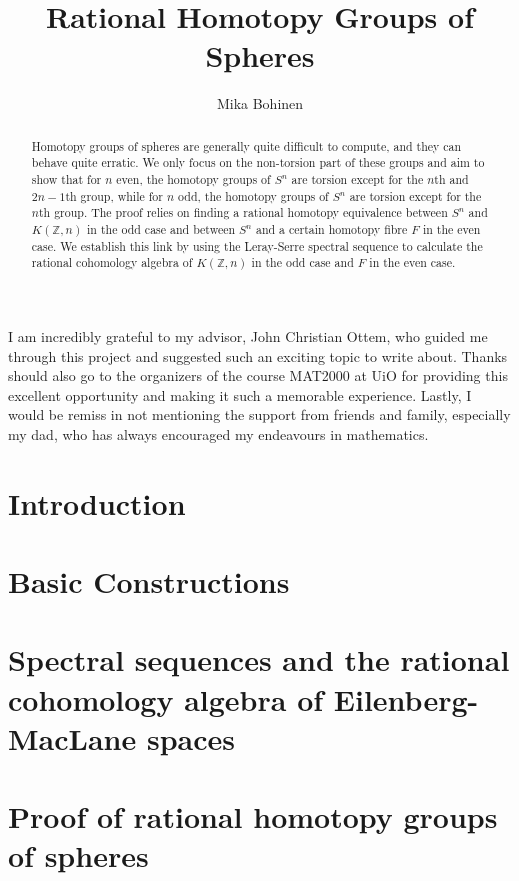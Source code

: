 \documentclass[a4paper, article, oneside, UKenglish]{report}
\title{Rational Homotopy Groups of Spheres}
\author{Mika Bohinen}
\newcommand{\Z}{\mathbb{Z}}   %
\newcommand{\0}{\mathbf{0}}
\newcommand{\1}{\mathbf{1}}
\begin{document}
\uiomasterfp[long=10,
             dept={Department of Mathematics},
             fac={},
             program={MAT2000},
             kind={Project work},
             color=blue,
             supervisor={John Christian Ottem}
]


\begin{abstract}
    \noindent
    Homotopy groups of spheres are generally quite difficult to compute,
    and they can behave quite erratic. We only focus on the non-torsion
    part of these groups and aim to show that for \( n \) even, the
    homotopy groups of \( S^n \) are torsion except for the \( n \)th and
    \( 2n-1 \)th group, while for \( n \) odd, the homotopy groups of
    \( S^n \) are torsion except for the \( n \)th group. The proof
    relies on finding a rational homotopy equivalence between \( S^n \) 
    and \( K(\Z, n) \) in the odd case and between \( S^n \) and
    a certain homotopy fibre \( F \) in the even case. We establish
    this link by using the Leray-Serre spectral sequence to 
    calculate the rational cohomology algebra of \( K(\Z, n) \) in
    the odd case and \( F \) in the even case.
    

\end{abstract}
\section*{}
I am incredibly grateful to my advisor,
John Christian Ottem, who
guided me through this project and suggested such an exciting
topic to write about. Thanks should also go to the organizers of the
course MAT2000 at UiO for providing this excellent opportunity and making it such
a memorable experience. Lastly, I would be remiss in not mentioning the
support from friends and family, especially my dad, who has always
encouraged my endeavours in mathematics.

\tableofcontents
{}

\chapter{Introduction}


\chapter{Basic Constructions}


\chapter{Spectral sequences and the rational cohomology algebra of Eilenberg-MacLane spaces}


\chapter{Proof of rational homotopy groups of spheres}

\printbibliography
\end{document}
